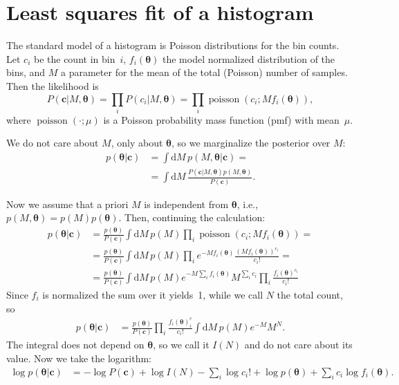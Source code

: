 \section{Least squares fit of a histogram}

The standard model of a histogram is Poisson distributions for the bin counts.
Let $c_i$ be the count in bin~$i$, $f_i(\boldsymbol\theta)$ the model
normalized distribution of the bins, and $M$ a parameter for the mean of the
total (Poisson) number of samples. Then the likelihood is
%
\begin{equation}
    P(\mathbf c|M,\boldsymbol\theta) =
    \prod_i P(c_i|M,\boldsymbol\theta) =
    \prod_i \operatorname{poisson}(c_i;Mf_i(\boldsymbol\theta)),
\end{equation}
%
where $\operatorname{poisson}(\cdot;\mu)$ is a Poisson probability mass
function (pmf) with mean~$\mu$.

We do not care about $M$, only about $\boldsymbol\theta$, so we marginalize
the posterior over $M$:
%
\begin{align}
    p(\boldsymbol\theta|\mathbf c)
    &= \int \mathrm dM\, p(M,\boldsymbol\theta|\mathbf c) = \\
    &= \int \mathrm dM\,
    \frac {P(\mathbf c|M,\boldsymbol\theta) p(M,\boldsymbol\theta)}
    {P(\mathbf c)}.
\end{align}

Now we assume that a priori $M$ is independent from $\boldsymbol\theta$, i.e., 
$p(M,\boldsymbol\theta) = p(M)p(\boldsymbol\theta)$. Then, continuing the
calculation:
%
\begin{align}
    p(\boldsymbol\theta|\mathbf c)
    &= \frac {p(\boldsymbol\theta)} {P(\mathbf c)}
    \int \mathrm dM\, p(M)
    \prod_i \operatorname{poisson}(c_i;Mf_i(\boldsymbol\theta)) = \\
    &= \frac {p(\boldsymbol\theta)} {P(\mathbf c)}
    \int \mathrm dM\, p(M)
    \prod_i
    e^{-Mf_i(\boldsymbol\theta)}
    \frac {(Mf_i(\boldsymbol\theta))^{c_i}} {c_i!} = \\
    &= \frac {p(\boldsymbol\theta)} {P(\mathbf c)}
    \int \mathrm dM\, p(M)
    e^{-M \sum_i f_i(\boldsymbol\theta)}
    M^{\sum_i c_i}
    \prod_i
    \frac {f_i(\boldsymbol\theta)^{c_i}} {c_i!}
\end{align}
%
Since $f_i$ is normalized the sum over it yields~1, while we call $N$ the total
count, so
%
\begin{align}
    p(\boldsymbol\theta|\mathbf c)
    &= \frac {p(\boldsymbol\theta)} {P(\mathbf c)}
    \prod_i
    \frac {f_i(\boldsymbol\theta)^c_i} {c_i!}
    \int \mathrm dM\, p(M) e^{-M} M^N.
\end{align}
%
The integral does not depend on $\boldsymbol\theta$, so we call it $I(N)$ and
do not care about its value. Now we take the logarithm:
%
\begin{align}
    \log p(\boldsymbol\theta|\mathbf c) &=
    -\log P(\mathbf c) + \log I(N) - \sum_i \log c_i!
    + \log p(\boldsymbol\theta) + \sum_i c_i \log f_i(\boldsymbol\theta).
\end{align}

